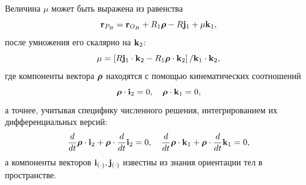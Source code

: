 Величина $\mu$ может быть выражена из равенства
$$
{\bf r}_{P_B}={\bf r}_{O_B}+R_1\boldsymbol{\mathbf{\rho}} -R{\bf j}_1+\mu {\bf k}_1,
$$
после умножения его скалярно на ${\bf k}_2$:
$$
\mu =\left[R{\bf j}_1\cdot{\bf k}_2-R_1{\boldsymbol{\mathbf{\rho}} }\cdot {\bf k}_2\right] /
{\bf k}_1\cdot{\bf k}_2,
$$
где компоненты вектора $\boldsymbol{\mathbf{\rho}}$ находятся с помощью кинематических соотношений
$$
\boldsymbol{\mathbf{\rho}}\cdot {\bf i}_2=0,\quad\boldsymbol{\mathbf{\rho}}\cdot {\bf k}_1=0,
$$
а точнее, учитывая специфику численного решения, интегрированием их дифференциальных версий:
$$
\dfrac{d}{dt}\boldsymbol{\mathbf{\rho}}\cdot {\bf i}_2+\boldsymbol{\mathbf{\rho}}\cdot\dfrac{d}{dt}{\bf i}_2=0,\quad
\dfrac{d}{dt}\boldsymbol{\mathbf{\rho}}\cdot {\bf k}_1+\boldsymbol{\mathbf{\rho}}\cdot\dfrac{d}{dt}{\bf k}_1=0,
$$
а компоненты векторов ${\bf i}_{(\cdot)},{\bf j}_{(\cdot)}$ известны из знания ориентации тел в пространстве.

%
%
%
%
%
%
%
%

